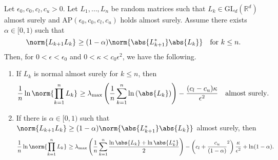 \begin{thm}
    Let \( \epsilon_0, c_0,c_l, c_u >0 \). Let \( L_1,\dots, L_n \) be random matrices such that \( L_k \in \mathrm{GL}_d(\mathbb{R}^{d}) \) almost surely and \( \mathrm{AP}\left(\epsilon_0, c_0,c_l, c_u\right) \) holds almost surely. Assume there exists \( \alpha \in [0,1) \) such that 
    \[ \norm{L_{k+1}L_k}_{} \geq (1-\alpha) \norm{ \abs{L_{k+1}^{*}} \abs{L_k}}  \quad \text{for \( k \leq n \)}. \]
    Then, for \( 0 < \epsilon < \epsilon_0 \) and \( 0 < \kappa < c_0 \epsilon^{2} \), we have the following.
\begin{enumerate}[1)]
  \item If \( L_k \) is normal almost surely for \( k \leq n \), then
    \[ \frac{1}{n} \operatorname{ln} \norm{\prod_{k=1}^{n}L_k}_{} \geq \lambda_{\text{max}}\left(\frac{1}{n} \sum_{k=1}^{n} \operatorname{ln}\left(\abs{L_k}\right)\right)-\frac{(c_l-c_u)\kappa}{\epsilon^{2}} \quad \text{almost surely}.\]
  \item If there is \( \alpha \in [0,1) \) such that \( \norm{L_{k+1}L_k} \geq (1-\alpha) \norm{\abs{L_{k+1}^{*}} \abs{L_{k}}}_{} \) almost surely, then 
    \[ \frac{1}{n} \operatorname{ln} \norm{\prod_{k=1}^{n} L_k}_{} \geq \lambda_{\text{max}}\left(\frac{1}{n} \sum_{k=1}^{n} \frac{\operatorname{ln} \abs{L_k}+ \operatorname{ln} \abs{L_k^{*}}}{2}\right)  - \left(c_l + \frac{c_u}{(1-\alpha)}^2\right) \frac{\kappa}{\epsilon^{2}}+ \operatorname{ln}(1-\alpha). \]
\end{enumerate}

  \end{thm}

\begin{corl}[]
    
\end{corl}


